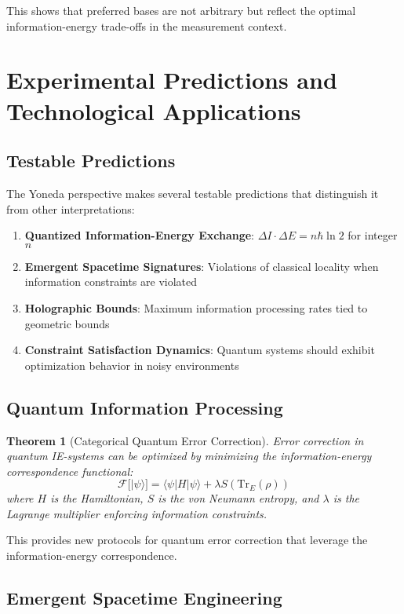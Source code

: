 \documentclass[12pt,a4paper]{article}
\newtheorem{theorem}{Theorem}[section]
\begin{document}
This shows that preferred bases are not arbitrary but reflect the optimal information-energy trade-offs in the measurement context.

\section{Experimental Predictions and Technological Applications}

\subsection{Testable Predictions}

The Yoneda perspective makes several testable predictions that distinguish it from other interpretations:
\begin{enumerate}
\item \textbf{Quantized Information-Energy Exchange}: $\Delta I \cdot \Delta E = n \hbar \ln 2$ for integer $n$
\item \textbf{Emergent Spacetime Signatures}: Violations of classical locality when information constraints are violated
\item \textbf{Holographic Bounds}: Maximum information processing rates tied to geometric bounds
\item \textbf{Constraint Satisfaction Dynamics}: Quantum systems should exhibit optimization behavior in noisy environments
\end{enumerate}

\subsection{Quantum Information Processing}

\begin{theorem}[Categorical Quantum Error Correction]
Error correction in quantum IE-systems can be optimized by minimizing the information-energy correspondence functional:
\[
\mathcal{F}[|\psi\rangle] = \langle\psi|H|\psi\rangle + \lambda S(\text{Tr}_E(\rho))
\]
where $H$ is the Hamiltonian, $S$ is the von Neumann entropy, and $\lambda$ is the Lagrange multiplier enforcing information constraints.
\end{theorem}

This provides new protocols for quantum error correction that leverage the information-energy correspondence.

\subsection{Emergent Spacetime Engineering}
\end{document}
